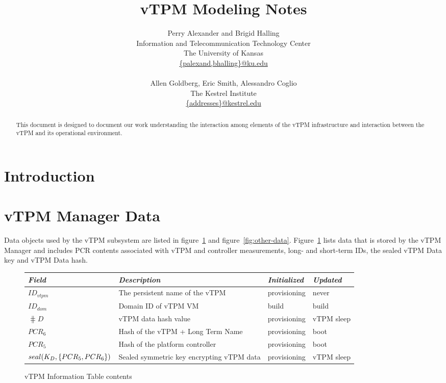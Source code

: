 \documentclass[10pt]{article}
\title{vTPM Modeling Notes}
\author{Perry Alexander and Brigid Halling \\
  Information and Telecommunication Technology Center \\
  The University of Kansas \\
  \url{{palexand,bhalling}@ku.edu} \\
  \\
  Allen Goldberg, Eric Smith, Alessandro Coglio \\
  The Kestrel Institute \\
  \url{{addresses}@kestrel.edu}}
\begin{document}
\maketitle
\tableofcontents
\listoffigures
\listoftables

\begin{abstract}
  This document is designed to document our work understanding the
  interaction among elements of the vTPM infrastructure and
  interaction between the vTPM and its operational environment.
\end{abstract}

\section{Introduction}

\section{vTPM Manager Data}

Data objects used by the vTPM subsystem are listed in
figure~\ref{fig:vtpm-information-table-format} and
figure~\ref{fig:other-data}.
Figure~\ref{fig:vtpm-information-table-format} lists data that is
stored by the vTPM Manager and includes PCR contents associated with
vTPM and controller measurements, long- and short-term IDs, the sealed
vTPM Data key and vTPM Data hash.

\begin{figure}[hbtp]
  \centering
  \begin{tabular}{llll}
    \emph{Field} & \emph{Description} & \emph{Initialized} &
    \emph{Updated} \\ \hline
    $ID_{vtpm}$ & The persistent name of the vTPM & provisioning &
    never \\
    $ID_{dom}$ & Domain ID of vTPM VM & build & build \\
    $\hash{D}$ & vTPM data hash value & provisioning & vTPM sleep \\
    $PCR_6$ & Hash of the vTPM + Long Term Name & provisioning & boot
    \\
    $PCR_5$ & Hash of the platform controller & provisioning & boot \\
    $seal(K_D,\{PCR_5,PCR_6\})$ & Sealed symmetric key encrypting vTPM data &
    provisioning & vTPM sleep \\
  \end{tabular}
  \caption{vTPM Information Table contents}
  \label{fig:vtpm-information-table-format}
\end{figure}
\end{document}

